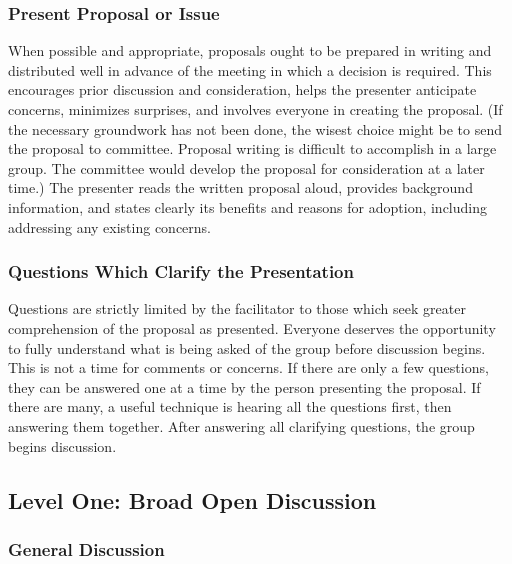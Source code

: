 \subsubsection*{Present Proposal or Issue}

When possible and appropriate, proposals ought to be prepared in
writing and distributed well in advance of the meeting in which a
decision is required. This encourages prior discussion and
consideration, helps the presenter anticipate concerns, minimizes
surprises, and involves everyone in creating the proposal. (If the
necessary groundwork has not been done, the wisest choice might be
to send the proposal to committee. Proposal writing is difficult to
accomplish in a large group. The committee would develop
the proposal for consideration at a later time.) The presenter
reads the written proposal aloud, provides background information,
and states clearly its benefits and reasons for adoption, including
addressing any existing concerns.

\subsubsection*{Questions Which Clarify the Presentation}
Questions are strictly limited by the facilitator to those which
seek greater comprehension of the proposal as presented. Everyone
deserves the opportunity to fully understand what is being asked
of the group before discussion begins. This is not a time for
comments or concerns. If there are only a few questions, they can
be answered one at a time by the person presenting the
proposal. If there are many, a useful technique is hearing all the
questions first, then answering them together. After answering all
clarifying questions, the group begins discussion.



\subsection*{Level One: Broad Open Discussion}
\subsubsection*{General Discussion}

